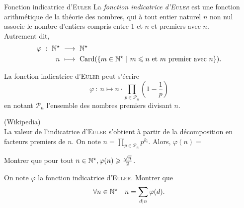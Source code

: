 \begin{defi}{Fonction indicatrice d'\textsc{Euler}}
    La \emph{fonction indicatrice d'\textsc{Euler}} est une fonction arithmétique de la théorie des nombres, qui à tout entier naturel $n$ non nul associe le nombre d'entiers compris entre 1 et $n$ et premiers avec $n$. \\
    Autrement dit, 
    \begin{alignat*}{2}
        \varphi\ :\ \mathbb{N}^\star\ &\longrightarrow\ \mathbb{N}^\star\\
        n\ &\longmapsto\ \mathrm{Card}(\{m \in \mathbb{N}^\star\ |\ m \leqslant n \text{ et } m \text{ premier avec } n \}).
    \end{alignat*}
\end{defi}


\begin{prop}
    La fonction indicatrice d'\textsc{Euler} peut s'écrire
    $$\varphi\ :\ n \longmapsto n \cdot \prod_{p \in \mathscr{P}_n} \left(1 - \frac{1}{p} \right)$$
    en notant $\mathscr{P}_n$ l'ensemble des nombres premiers divisant $n$.
\end{prop}

\begin{preuve}
    (Wikipedia) \\
    La valeur de l'indicatrice d'\textsc{Euler} s'obtient à partir de la décomposition en facteurs premiers de $n$. On note $n = \prod\limits_{p \in \mathscr{P}_n} p^{k_i}$. Alors, $\varphi(n) = $
\end{preuve}

\begin{exercice}
    Montrer que pour tout $n \in \mathbb{N}^\star, \varphi(n) \geqslant \frac{\sqrt{n}}{2}$.
\end{exercice}

\begin{exercice}
    On note $\varphi$ la fonction indicatrice d'\textsc{Euler}. Montrer que 
    $$\forall n \in \mathbb{N}^\star \quad n = \sum_{d|n} \varphi(d).$$
\end{exercice}

